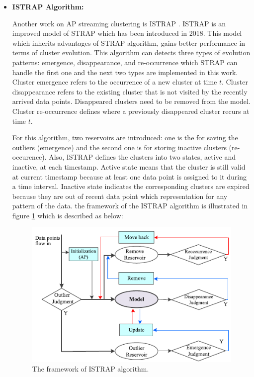 \documentclass[../UNBThesis2.tex]{subfiles}
\begin{document}
\begin{itemize}[leftmargin=*]
\item[]\textbf{ISTRAP Algorithm:}

Another work on AP streaming clustering is ISTRAP \cite{sui2018dynamic}. ISTRAP is an improved model of STRAP which has been introduced in 2018. This model which inherits advantages of STRAP algorithm, gains better performance in terms of cluster evolution. This algorithm can detects three types of evolution patterns: emergence, disappearance, and re-occurrence which STRAP can handle the first one and the next two types are implemented in this work. Cluster emergence refers to the occurrence of a new cluster at time $t$. Cluster disappearance refers to the existing cluster that is not visited by the recently arrived data
points. Disappeared clusters need to be removed from the model. Cluster re-occurrence defines where a previously disappeared cluster recurs at time $t$.

For this algorithm, two reservoirs are introduced: one is the for saving the outliers (emergence) and the second one is for storing inactive clusters (re-occurence). Also, ISTRAP defines the clusters into two states, active and inactive, at each timestamp. Active state means that the cluster is still valid at current timestamp because at least one data point is assigned to it during a time interval. Inactive state indicates the corresponding clusters are expired because they are out of recent data point which representation for any pattern of the data.
the framework of the ISTRAP algorithm is illustrated in figure \ref{istrap} which is described as below:

\begin{figure}
\centering
\includegraphics[width =10 cm]{image/Chapters/Chapter3/istrap1.PNG}
\caption{The framework of ISTRAP algorithm.}
\label{istrap}
\end{figure}


\end{itemize}
\end{document}
